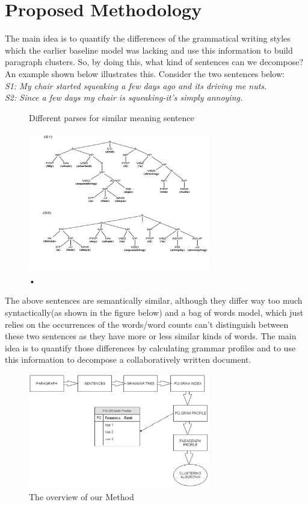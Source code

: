 \documentclass[letterpaper]{article}
\begin{document}
\section{Proposed Methodology}
The main idea is to quantify the differences of the grammatical writing styles which the earlier baseline model was lacking and use this information to build paragraph clusters. So, by doing this, what kind of sentences can we decompose? An example shown below illustrates this. Consider the two sentences below:\\
\textit{S1: My chair started squeaking a few days ago and its driving me nuts.\\
S2: Since a few days my chair is squeaking-it’s simply annoying.\\}
\begin{figure}[H]
\caption{Different parses for similar meaning sentence}
\caption{•}
\includegraphics[width=8cm]{u2.jpg}
\end{figure}
The above sentences are semantically similar, although they differ way too much syntactically(as shown in the figure below) and a bag of words model, which just relies on the occurrences of the words/word counts can’t distinguish between these two sentences as they have more or less similar kinds of words. The main idea is to quantify those differences by calculating grammar profiles and to use this information to decompose a collaboratively written document.
\begin{figure}[H]

\caption{The overview of our Method}
\includegraphics[width=8cm]{u3.jpg}

\end{figure}
\end{document}
